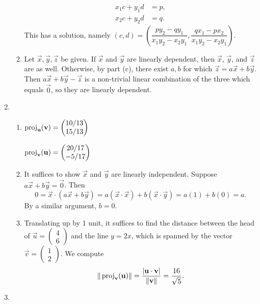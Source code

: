 \begin{enumerate}
\begin{enumerate}
\begin{align*}
x_1c + y_1d &= p, \\
x_2c + y_2d &= q.
\end{align*}
This has a solution, namely $(c,d) = \left(\dfrac{py_2 - qy_1}{x_1y_2 - x_2y_1}, \dfrac{qx_1 - px_2}{x_1y_2 - x_2y_1}\right)$.
\item Let $\vec{x},\vec{y},\vec{z}$ be given. If $\vec{x}$ and $\vec{y}$ are linearly dependent, then $\vec{x}$, $\vec{y}$, and $\vec{z}$ are as well. Otherwise, by part (c), there exist $a,b$ for which $\vec{z} = a\vec{x} + b\vec{y}$. Then $a\vec{x} + b\vec{y} - \vec{z}$ is a non-trivial linear combination of the three which equals $\vec{0}$, so they are linearly dependent.
\end{enumerate}
\item \begin{enumerate}
\item $\operatorname{proj}_{\mathbf{u}}(\mathbf{v}) = \begin{pmatrix} 10/13 \\ 15/13 \end{pmatrix}$\par
$\operatorname{proj}_{\mathbf{v}}(\mathbf{u}) = \begin{pmatrix} 20/17 \\ -5/17 \end{pmatrix}$
\item It suffices to show $\vec{x}$ and $\vec{y}$ are linearly independent. Suppose $a\vec{x} + b\vec{y} = \vec{0}$. Then
\begin{equation*}
0 = \vec{x}\cdot (a\vec{x} + b\vec{y}) = a(\vec{x}\cdot\vec{x}) + b(\vec{x}\cdot\vec{y}) = a(1) + b(0) = a.
\end{equation*}
By a similar argument, $b = 0$.
\item Translating up by 1 unit, it suffices to find the distance between the head of $\vec{u} = \begin{pmatrix} 4 \\ 6 \end{pmatrix}$ and the line $y = 2x$, which is spanned by the vector $\vec{v} = \begin{pmatrix} 1 \\ 2 \end{pmatrix}$. We compute
\begin{equation*}
\|\operatorname{proj}_{\mathbf{v}}(\mathbf{u})\| = \frac{\lvert\mathbf{u}\cdot\mathbf{v}\rvert}{\|\mathbf{v}\|} = \frac{16}{\sqrt{5}}.
\end{equation*}
\end{enumerate}
\item \begin{enumerate}

\end{enumerate}
\end{enumerate}
